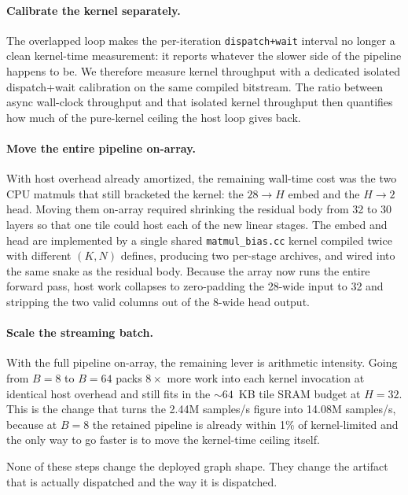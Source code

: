 \documentclass[a4paper,11pt]{article}
\newcommand{\code}[1]{\texttt{#1}}
\begin{document}
\paragraph{Calibrate the kernel separately.} The overlapped loop makes the
per-iteration \texttt{dispatch+wait} interval no longer a clean kernel-time
measurement: it reports whatever the slower side of the pipeline happens to
be. We therefore measure kernel throughput with a dedicated isolated
dispatch+wait calibration on the same compiled bitstream. The ratio between
async wall-clock throughput and that isolated kernel throughput then
quantifies how much of the pure-kernel ceiling the host loop gives back.

\paragraph{Move the entire pipeline on-array.} With host overhead already
amortized, the remaining wall-time cost was the two CPU matmuls that still
bracketed the kernel: the $28 \rightarrow H$ embed and the $H \rightarrow 2$
head. Moving them on-array required shrinking the residual body from 32 to 30
layers so that one tile could host each of the new linear stages. The embed and
head are implemented by a single shared \code{matmul\_bias.cc} kernel compiled
twice with different $(K, N)$ defines, producing two per-stage archives, and
wired into the same snake as the residual body. Because the array now runs the
entire forward pass, host work collapses to zero-padding the 28-wide input to
32 and stripping the two valid columns out of the 8-wide head output.

\paragraph{Scale the streaming batch.} With the full pipeline on-array, the
remaining lever is arithmetic intensity. Going from $B=8$ to $B=64$ packs
$8\times$ more work into each kernel invocation at identical host overhead and
still fits in the $\sim\!64$~KB tile SRAM budget at $H=32$. This is the change
that turns the 2.44M samples/s figure into 14.08M samples/s, because at $B=8$
the retained pipeline is already within 1\% of kernel-limited and the only way
to go faster is to move the kernel-time ceiling itself.

None of these steps change the deployed graph shape. They change the artifact
that is actually dispatched and the way it is dispatched.

\FloatBarrier
\clearpage
\end{document}
